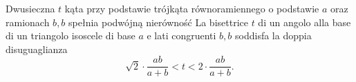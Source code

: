 \begin{proposition}
	Dwusieczna $t$ kąta przy podstawie trójkąta równoramiennego o podstawie $a$ oraz ramionach $b, b$ spełnia podwójną nierówność %
	La bisettrice $t$ di un angolo alla base di un triangolo isoscele di base $a$ e lati congruenti $b, b$ soddisfa la doppia disuguaglianza %
	\begin{equation}
		\sqrt{2} \cdot \frac{ab}{a+b} < t < 2 \cdot \frac{ab}{a+b}.
	\end{equation}
\end{proposition}

%